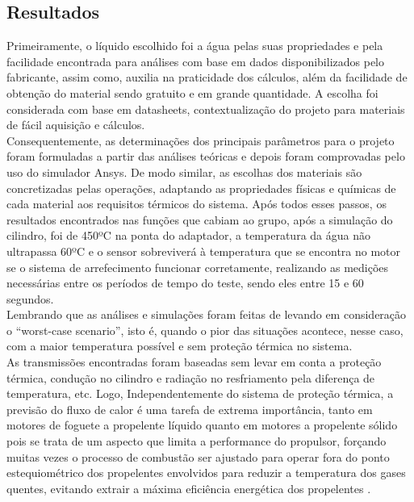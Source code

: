 \subsection{Resultados}
Primeiramente, o líquido escolhido foi a água pelas suas propriedades e pela facilidade encontrada para análises com base em dados disponibilizados pelo fabricante, assim como, auxilia na praticidade dos cálculos, além da facilidade de obtenção do material sendo gratuito e em grande quantidade. A escolha foi considerada com base em datasheets, contextualização do projeto para materiais de fácil aquisição e cálculos.\\
Consequentemente, as determinações dos principais parâmetros para o projeto foram formuladas a partir das análises teóricas e depois foram comprovadas pelo uso do simulador Ansys. De modo similar, as escolhas dos materiais são concretizadas pelas operações, adaptando as propriedades físicas e químicas de cada material aos requisitos térmicos do sistema.
Após todos esses passos, os resultados encontrados nas funções que cabiam ao grupo, após a simulação do cilindro, foi de 450ºC na ponta do adaptador, a temperatura da água não ultrapassa 60ºC e o sensor sobreviverá à temperatura que se encontra no motor se o sistema de arrefecimento funcionar corretamente, realizando as medições necessárias entre os períodos de tempo do teste, sendo eles entre 15 e 60 segundos.\\ Lembrando que as análises e simulações foram feitas de levando em consideração o “worst-case scenario”, isto é, quando o pior das situações acontece, nesse caso, com a maior temperatura possível e sem proteção térmica no sistema.\\
As transmissões encontradas foram baseadas sem levar em conta a proteção térmica, condução no cilindro e radiação no resfriamento pela diferença de temperatura, etc. Logo, Independentemente do sistema de proteção térmica, a previsão do fluxo de calor é uma tarefa de extrema importância, tanto em motores de foguete a propelente líquido quanto em motores a propelente sólido pois se trata de um aspecto que limita a performance do propulsor, forçando muitas vezes o processo de combustão ser ajustado para operar fora do ponto estequiométrico dos propelentes envolvidos para reduzir a temperatura dos gases quentes, evitando extrair a máxima eficiência energética dos propelentes \cite{PATIREJr2010}. 

     
